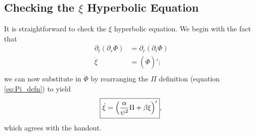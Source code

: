 \documentclass[12pt]{article}
\numberwithin{equation}{section}
\begin{document}
\subsection{Checking the $\xi$ Hyperbolic Equation}
It is straightforward to check the $\xi$ hyperbolic equation.  We begin with the fact that
\begin{equation}
\begin{aligned}
\partial_t (\partial_r \Phi) &= \partial_r (\partial_t \Phi) \\
\dot{\xi} &= (\dot{\Phi})'; \\
\end{aligned}
\end{equation}
we can now substitute in $\dot{\Phi}$ by rearranging the $\Pi$ definition (equation \ref{eq:Pi_defn}) to yield
\begin{equation}
\boxed{ \dot{\xi} = \Big( \frac{\alpha}{\psi^2} \Pi + \beta \xi \Big)' }, \\
\end{equation}
which agrees with the handout.
\end{document}
